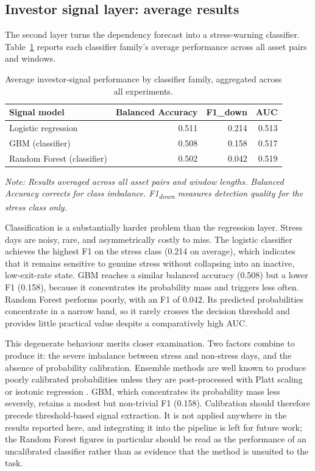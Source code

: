\subsection{Investor signal layer: average results}

The second layer turns the dependency forecast into a stress-warning classifier. Table~\ref{tab:signal_summary} reports each classifier family's average performance across all asset pairs and windows.

\begin{table}[H]
    \centering
    \caption{Average investor-signal performance by classifier family, aggregated across all experiments.}
    \label{tab:signal_summary}
    \begin{tabular}{lrrr}
        \toprule
        Signal model & Balanced Accuracy & F1\_down & AUC \\
        \midrule
        Logistic regression    & 0.511 & 0.214 & 0.513 \\
        GBM (classifier)       & 0.508 & 0.158 & 0.517 \\
        Random Forest (classifier) & 0.502 & 0.042 & 0.519 \\
        \bottomrule
    \end{tabular}
    \par\smallskip\noindent\footnotesize{\textit{Note: Results averaged across all asset pairs and window lengths. Balanced Accuracy corrects for class imbalance. F1\textsubscript{down} measures detection quality for the stress class only.}}
\end{table}

Classification is a substantially harder problem than the regression layer. Stress days are noisy, rare, and asymmetrically costly to miss. The logistic classifier achieves the highest F1 on the stress class (0.214 on average), which indicates that it remains sensitive to genuine stress without collapsing into an inactive, low-exit-rate state. GBM reaches a similar balanced accuracy (0.508) but a lower F1 (0.158), because it concentrates its probability mass and triggers less often. Random Forest performs poorly, with an F1 of 0.042. Its predicted probabilities concentrate in a narrow band, so it rarely crosses the decision threshold and provides little practical value despite a comparatively high AUC.

This degenerate behaviour merits closer examination. Two factors combine to produce it: the severe imbalance between stress and non-stress days, and the absence of probability calibration. Ensemble methods are well known to produce poorly calibrated probabilities unless they are post-processed with Platt scaling \cite{platt1999probabilistic} or isotonic regression \cite{niculescu2005predicting}. GBM, which concentrates its probability mass less severely, retains a modest but non-trivial F1 (0.158). Calibration should therefore precede threshold-based signal extraction. It is not applied anywhere in the results reported here, and integrating it into the pipeline is left for future work; the Random Forest figures in particular should be read as the performance of an uncalibrated classifier rather than as evidence that the method is unsuited to the task.

